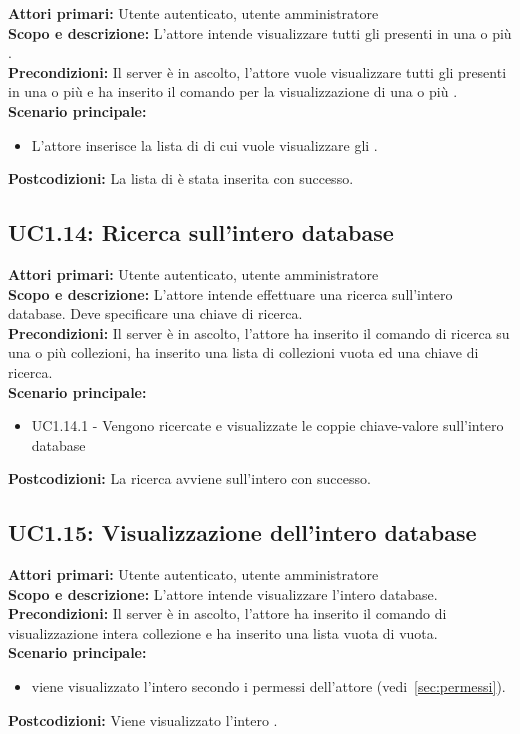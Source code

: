 \documentclass{scalatekids-article}
\begin{document}
\textbf{Attori primari:} Utente autenticato, utente amministratore\\
\textbf{Scopo e descrizione:} L'attore intende visualizzare tutti gli  presenti in una o più .\\
\textbf{Precondizioni:} Il server è in ascolto, l'attore vuole visualizzare tutti gli  presenti in una o più  e ha inserito il comando per la visualizzazione di una o più .\\
\textbf{Scenario principale:}
\begin{itemize}
\item L'attore inserisce la lista di  di cui vuole visualizzare gli .
\end{itemize}
\textbf{Postcodizioni:} La lista di  è stata inserita con successo.

\subsection{UC1.14: Ricerca sull'intero database}

\textbf{Attori primari:} Utente autenticato, utente amministratore\\
\textbf{Scopo e descrizione:} L'attore intende effettuare una ricerca sull'intero database. Deve specificare una chiave di ricerca.\\
\textbf{Precondizioni:} Il server è in ascolto, l'attore ha inserito il comando di ricerca su una o più collezioni, ha inserito una lista di collezioni vuota ed una chiave di ricerca.\\
\textbf{Scenario principale:}
\begin{itemize}
\item UC1.14.1 - Vengono ricercate e visualizzate le coppie chiave-valore sull'intero database
\end{itemize}
\textbf{Postcodizioni:} La ricerca avviene sull'intero  con successo.

\subsection{UC1.15: Visualizzazione dell'intero database}

\textbf{Attori primari:} Utente autenticato, utente amministratore\\
\textbf{Scopo e descrizione:} L'attore intende visualizzare l'intero database.\\
\textbf{Precondizioni:} Il server è in ascolto, l'attore ha inserito il comando di visualizzazione intera collezione e ha inserito una lista vuota di  vuota.\\
\textbf{Scenario principale:}
\begin{itemize}
\item viene visualizzato l'intero  secondo i permessi dell'attore (vedi~\ref{sec:permessi}).
\end{itemize}
\textbf{Postcodizioni:} Viene visualizzato l'intero .
\end{document}
